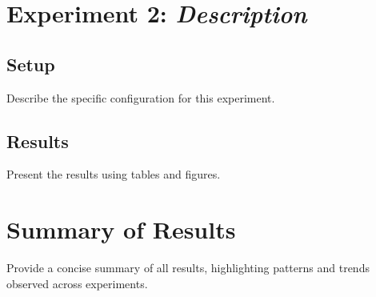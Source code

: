 \section{Experiment 2: \emph{Description}}
\label{sec:exp2}

\subsection{Setup}
\label{sec:exp2-setup}

Describe the specific configuration for this experiment.

\subsection{Results}
\label{sec:exp2-results}

Present the results using tables and figures.

\section{Summary of Results}
\label{sec:results-summary}

Provide a concise summary of all results, highlighting patterns and
trends observed across experiments.
